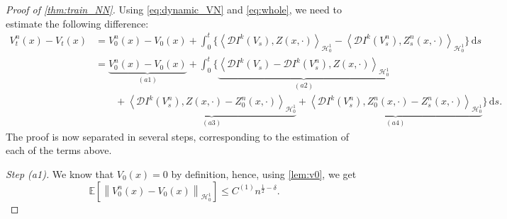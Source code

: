 \documentclass[11pt,a4paper,reqno]{amsart}
\numberwithin{equation}{section}
\theoremstyle{plain}
\theoremstyle{definition}
\def\ud{\mathrm d}
\newcommand{\ip}[1]{\left\langle#1\right\rangle}
\newcommand{\E}{\mathbb{E}}
\newcommand{\cH}{\mathcal{H}}
\newcommand{\norm}[1]{\left\|#1 \right\|} %
\begin{document}
\begin{proof}[Proof of \cref{thm:train_NN}]
Using \eqref{eq:dynamic_VN} and \eqref{eq:whole}, we need to estimate the following difference:
\begin{align*}
V^n_t (x) - V_t (x) 
    &= V^n_0 (x) - V_0 (x) + \int_0^t \Big\{ \ip{\mathcal{D} I^k \left( V_s \right), Z( x, \cdot)}_{\cH_0^1} - \ip{\mathcal{D}I^k \left( V^n_s \right), Z_s^n \left( x, \cdot\right)}_{\cH_0^1} \Big\} \, \ud s \\
    &= \underbrace{V^n_0 (x) - V_0 (x)}_{\left( a1 \right)} + \int_0^t \Big\{ \underbrace{\ip{\mathcal{D}I^k \left( V_s \right) - \mathcal{D}I^k \left( V^n_s \right), Z( x, \cdot)}_{\cH_0^1}}_{\left( a2 \right)} \\
    &\qquad+ \underbrace{\ip{\mathcal{D}I^k \left( V^n_s \right), Z( x, \cdot) - Z_0^n \left( x, \cdot\right)}_{\cH_0^1}}_{\left( a3 \right)} + \underbrace{\ip{\mathcal{D}I^k \left( V^n_s \right), Z^n_0 \left( x, \cdot\right) - Z_s^n \left( x, \cdot\right)}_{\cH_0^1}}_{\left( a4 \right)} \Big\} \, \ud s.
\end{align*}
The proof is now separated in several steps, corresponding to the estimation of each of the terms above.

\noindent\textit{Step (a1).}
We know that $V_0(x)=0$ by definition, hence, using \cref{lem:v0}, we get 
\[
    \E \left[ \norm{V^n_0 (x) - V_0 (x)}_{\cH_0^1} \right] \le C^{\left( 1 \right)}n^{\frac{1}{2} - \delta}. 
\]


\end{proof}
\end{document}
